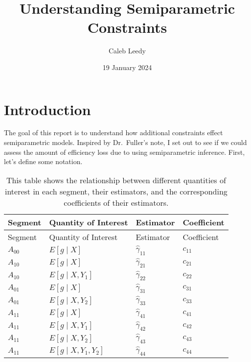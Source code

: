 \documentclass[
  letterpaper,
  DIV=11,
  numbers=noendperiod]{scrartcl}
\title{Understanding Semiparametric Constraints}
\author{Caleb Leedy}
\date{19 January 2024}
\begin{document}
\maketitle
\ifdefined\Shaded\renewenvironment{Shaded}{\begin{tcolorbox}[breakable, enhanced, boxrule=0pt, borderline west={3pt}{0pt}{shadecolor}, sharp corners, interior hidden, frame hidden]}{\end{tcolorbox}}\fi

\hypertarget{sec-intro}{%
\section{Introduction}\label{sec-intro}}

The goal of this report is to understand how additional constraints
effect semiparametric models. Inspired by Dr.~Fuller's note, I set out
to see if we could assess the amount of efficiency loss due to using
semiparametric inference. First, let's define some notation.

\hypertarget{tbl-reftab}{}
\begin{longtable}[]{@{}llll@{}}
\caption{\label{tbl-reftab}This table shows the relationship between
different quantities of interest in each segment, their estimators, and
the corresponding coefficients of their estimators.}\tabularnewline
\toprule\noalign{}
Segment & Quantity of Interest & Estimator & Coefficient \\
\midrule\noalign{}
\endfirsthead
\toprule\noalign{}
Segment & Quantity of Interest & Estimator & Coefficient \\
\midrule\noalign{}
\endhead
\bottomrule\noalign{}
\endlastfoot
\(A_{00}\) & \(E[g \mid X]\) & \(\hat \gamma_{11}\) & \(c_{11}\) \\
\(A_{10}\) & \(E[g \mid X]\) & \(\hat \gamma_{21}\) & \(c_{21}\) \\
\(A_{10}\) & \(E[g \mid X, Y_1]\) & \(\hat \gamma_{22}\) & \(c_{22}\) \\
\(A_{01}\) & \(E[g \mid X]\) & \(\hat \gamma_{31}\) & \(c_{31}\) \\
\(A_{01}\) & \(E[g \mid X, Y_2]\) & \(\hat \gamma_{33}\) & \(c_{33}\) \\
\(A_{11}\) & \(E[g \mid X]\) & \(\hat \gamma_{41}\) & \(c_{41}\) \\
\(A_{11}\) & \(E[g \mid X, Y_1]\) & \(\hat \gamma_{42}\) & \(c_{42}\) \\
\(A_{11}\) & \(E[g \mid X, Y_2]\) & \(\hat \gamma_{43}\) & \(c_{43}\) \\
\(A_{11}\) & \(E[g \mid X, Y_1, Y_2]\) & \(\hat \gamma_{44}\) &
\(c_{44}\) \\
\end{longtable}
\end{document}
